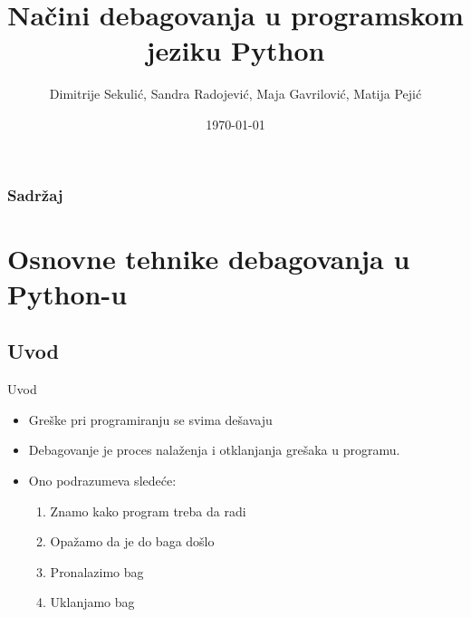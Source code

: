 \documentclass{beamer}
\title[Debagovanje Python]{Načini debagovanja u programskom\\ jeziku Python} %
\author{Dimitrije Sekulić, Sandra Radojević, Maja Gavrilović, Matija Pejić} %
\institute[UCLA] %
{
Matematički fakultet, Beograd \\ %
\medskip
}
\date{\today} %
\begin{document}
\begingroup
\makeatletter
\setlength{\hoffset}{.5\beamer@sidebarwidth}
\makeatother
\begin{frame}[plain]
    \titlepage
\end{frame}
\endgroup


\begin{frame}[plain]
\frametitle{Sadržaj} %
\tableofcontents %
\end{frame}


\section{Osnovne tehnike debagovanja u Python-u} %
\subsection{Uvod}

\begin{frame}{Uvod}
\begin{itemize}
    \item Greške pri programiranju se svima dešavaju
    \item Debagovanje je proces nalaženja i otklanjanja grešaka u programu.
    \item Ono podrazumeva sledeće: 
    \begin{enumerate}
        \item Znamo kako program treba da radi
        \item Opažamo da je do baga došlo
        \item Pronalazimo bag
        \item Uklanjamo bag
    \end{enumerate}
\end{itemize}
\end{frame}
\end{document}
